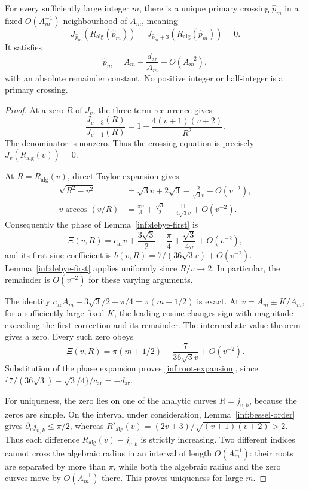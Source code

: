 \begin{proposition}\label{inf:primary-expansion}
For every sufficiently large integer $m$, there is a unique primary
crossing $\widehat p_m$ in a fixed $O(A_m^{-1})$ neighbourhood of $A_m$,
meaning
\[
 J_{\widehat p_m}(R_{\mathrm{alg}}(\widehat p_m))
 =J_{\widehat p_m+3}(R_{\mathrm{alg}}(\widehat p_m))=0.
\]
It satisfies
\begin{equation}\label{inf:root-expansion}
 \widehat p_m=A_m-\frac{d_{\mathrm{ar}}}{A_m}+O(A_m^{-2}),
\end{equation}
with an absolute remainder constant. No positive integer or
half-integer is a primary crossing.
\end{proposition}
\begin{proof}
At a zero $R$ of $J_v$, the three-term recurrence gives
\begin{equation}\label{inf:crossing-recurrence}
 \frac{J_{v+3}(R)}{J_{v-1}(R)}
 =1-\frac{4(v+1)(v+2)}{R^2}.
\end{equation}
The denominator is nonzero. Thus the crossing equation is precisely
$J_v(R_{\mathrm{alg}}(v))=0$.

At $R=R_{\mathrm{alg}}(v)$, direct Taylor expansion gives
\begin{align*}
 \sqrt{R^2-v^2}&=\sqrt3v+2\sqrt3-\frac2{\sqrt3v}+O(v^{-2}),\\
 v\arccos(v/R)&=\frac{\pi v}{3}+\frac{\sqrt3}{2}
                       -\frac{11}{4\sqrt3v}+O(v^{-2}).
\end{align*}
Consequently the phase of Lemma~\ref{inf:debye-first} is
\[
 \Xi(v,R)=c_{\mathrm{ar}}v+\frac{3\sqrt3}{2}-\frac\pi4
                         +\frac{\sqrt3}{4v}+O(v^{-2}),
\]
and its first sine coefficient is
$b(v,R)=7/(36\sqrt3v)+O(v^{-2})$.
Lemma~\ref{inf:debye-first} applies uniformly since $R/v\to2$.
In particular, the remainder is $O(v^{-2})$ for these varying
arguments.

The identity
$c_{\mathrm{ar}}A_m+3\sqrt3/2-\pi/4=\pi(m+1/2)$ is exact.
At $v=A_m\pm K/A_m$, for a sufficiently large fixed $K$, the leading
cosine changes sign with magnitude exceeding the first correction
and its remainder. The intermediate value theorem gives a zero.
Every such zero obeys
\[
 \Xi(v,R)=\pi(m+1/2)+\frac7{36\sqrt3v}+O(v^{-2}).
\]
Substitution of the phase expansion proves
\eqref{inf:root-expansion}, since
$\{7/(36\sqrt3)-\sqrt3/4\}/c_{\mathrm{ar}}=-d_{\mathrm{ar}}$.

For uniqueness, the zero lies on one of the analytic curves
$R=j_{v,k}$, because the zeros are simple. On the interval under
consideration, Lemma~\ref{inf:bessel-order} gives
$\partial_vj_{v,k}\le\pi/2$, whereas
$R'_{\mathrm{alg}}(v)=(2v+3)/\sqrt{(v+1)(v+2)}>2$.
Thus each difference $R_{\mathrm{alg}}(v)-j_{v,k}$ is strictly
increasing. Two different indices cannot cross the algebraic radius
in an interval of length $O(A_m^{-1})$: their roots are separated by
more than $\pi$, while both the algebraic radius and the zero curves
move by $O(A_m^{-1})$ there. This proves uniqueness for large $m$.


\end{proof}
